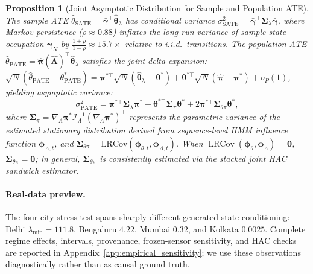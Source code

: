 \documentclass[twoside]{article}
\newtheorem{proposition}{Proposition}
\theoremstyle{definition}
\begin{document}
\begin{proposition}[Joint Asymptotic Distribution for Sample and Population ATE]
\label{prop:variance}
The sample ATE $\hat{\theta}_{\mathrm{SATE}} = \bar{\boldsymbol{\gamma}}^\top \hat{\boldsymbol{\theta}}_\lambda$ has conditional variance $\sigma_{\mathrm{SATE}}^2 = \bar{\boldsymbol{\gamma}}^\top \boldsymbol{\Sigma}_\lambda \bar{\boldsymbol{\gamma}}$, where Markov persistence ($\rho \approx 0.88$) inflates the long-run variance of sample state occupation $\bar{\boldsymbol{\gamma}}_N$ by $\frac{1+\rho}{1-\rho} \approx 15.7\times$ relative to i.i.d.\ transitions. The population ATE $\hat{\theta}_{\mathrm{PATE}} = \hat{\boldsymbol{\pi}}(\hat{\boldsymbol{\Lambda}})^\top \hat{\boldsymbol{\theta}}_\lambda$ satisfies the joint delta expansion: $\sqrt{N}(\hat{\theta}_{\mathrm{PATE}} - \theta_{\mathrm{PATE}}^*) = \boldsymbol{\pi}^{*\top} \sqrt{N}(\hat{\boldsymbol{\theta}}_\lambda - \boldsymbol{\theta}^*) + \boldsymbol{\theta}^{*\top} \sqrt{N}(\hat{\boldsymbol{\pi}} - \boldsymbol{\pi}^*) + o_P(1)$, yielding asymptotic variance:
\begin{equation}
    \sigma_{\mathrm{PATE}}^2 = \boldsymbol{\pi}^{*\top} \boldsymbol{\Sigma}_\lambda \boldsymbol{\pi}^* + \boldsymbol{\theta}^{*\top} \boldsymbol{\Sigma}_\pi \boldsymbol{\theta}^* + 2 \boldsymbol{\pi}^{*\top} \boldsymbol{\Sigma}_{\theta \pi} \boldsymbol{\theta}^*,
\end{equation}
where $\boldsymbol{\Sigma}_\pi = \nabla_\Lambda \boldsymbol{\pi}^* \mathcal{I}_\Lambda^{-1} (\nabla_\Lambda \boldsymbol{\pi}^*)^\top$ represents the parametric variance of the estimated stationary distribution derived from sequence-level HMM influence function $\boldsymbol{\phi}_{\Lambda, t}$, and $\boldsymbol{\Sigma}_{\theta\pi} = \mathrm{LRCov}(\boldsymbol{\phi}_{\theta, t}, \boldsymbol{\phi}_{\Lambda, t})$. When $\operatorname{LRCov}(\boldsymbol{\phi}_\theta, \boldsymbol{\phi}_\Lambda) = \mathbf{0}$, $\boldsymbol{\Sigma}_{\theta\pi} = \mathbf{0}$; in general, $\boldsymbol{\Sigma}_{\theta \pi}$ is consistently estimated via the stacked joint HAC sandwich estimator.
\end{proposition}

\paragraph{Real-data preview.} The four-city stress test spans sharply different generated-state conditioning: Delhi $\lambda_{\min}=111.8$, Bengaluru $4.22$, Mumbai $0.32$, and Kolkata $0.0025$. Complete regime effects, intervals, provenance, frozen-sensor sensitivity, and HAC checks are reported in Appendix~\ref{app:empirical_sensitivity}; we use these observations diagnostically rather than as causal ground truth.
\end{document}
